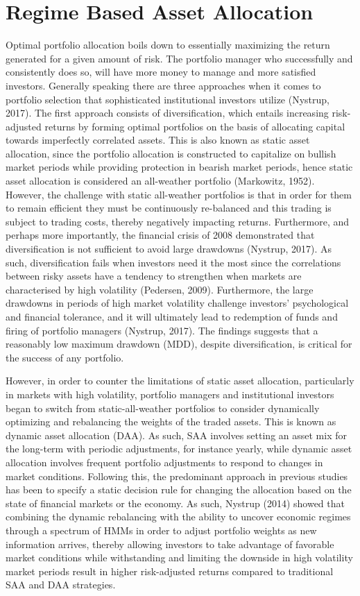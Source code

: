 \newpage

\section{Regime Based Asset Allocation}
Optimal portfolio allocation boils down to essentially maximizing the return generated for a given amount of risk. The portfolio manager who successfully and consistently does so, will have more money to manage and more satisfied investors. Generally speaking there are three approaches when it comes to portfolio selection that sophisticated institutional investors utilize (Nystrup, 2017). The first approach consists of diversification, which entails increasing risk-adjusted returns by forming optimal portfolios on the basis of allocating capital towards imperfectly correlated assets. This is also known as static asset allocation, since the portfolio allocation is constructed to capitalize on bullish market periods while providing protection in bearish market periods, hence static asset allocation is considered an all-weather portfolio (Markowitz, 1952). However, the challenge with static all-weather portfolios is that in order for them to remain efficient they must be continuously re-balanced and this trading is subject to trading costs, thereby negatively impacting returns. Furthermore, and perhaps more importantly, the financial crisis of 2008 demonstrated that diversification is not sufficient to avoid large drawdowns (Nystrup, 2017). As such, diversification fails when investors need it the most since the correlations between risky assets have a tendency to strengthen when markets are characterised by high volatility (Pedersen, 2009). Furthermore, the large drawdowns in periods of high market volatility challenge investors' psychological and financial tolerance, and it will ultimately lead to redemption of funds and firing of portfolio managers (Nystrup, 2017). The findings suggests that a reasonably low maximum drawdown (MDD), despite diversification, is critical for the success of any portfolio.

However, in order to counter the limitations of static asset allocation, particularly in markets with high volatility, portfolio managers and institutional investors began to switch from static-all-weather portfolios to consider dynamically optimizing and rebalancing the weights of the traded assets. This is known as dynamic asset allocation (DAA). As such, SAA involves setting an asset mix for the long-term with periodic adjustments, for instance yearly, while dynamic asset allocation involves frequent portfolio adjustments to respond to changes in market conditions. Following this, the predominant approach in previous studies has been to specify a static decision rule for changing the allocation based on the state of financial markets or the economy. As such, Nystrup (2014) showed that combining the dynamic rebalancing with the ability to uncover economic regimes through a spectrum of HMMs in order to adjust portfolio weights as new information arrives, thereby allowing investors to take advantage of favorable market conditions while withstanding and limiting the downside in high volatility market periods result in higher risk-adjusted returns compared to traditional SAA and DAA strategies. 

